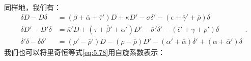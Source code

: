 同样地，我们有：
\begin{equation*}
	\begin{aligned}
		\delta D-D\delta  & =( \beta +\overline{\alpha } +\overline{\tau } ') D+\kappa D'-\sigma \delta '-( \epsilon +\overline{\gamma } '+\overline{\rho }) \delta \\
		\delta D'-D'\delta  & =\overline{\kappa } 'D+( \tau +\overline{\beta } '+\alpha ') D'-\overline{\sigma } '\delta '-(\overline{\epsilon } '+\gamma +\rho ') \delta \\
		\delta '\delta -\delta \delta ' & =( \rho '-\overline{\rho } ') D-(\rho -\overline{\rho } )D'-( \alpha '+\overline{\alpha }) \delta '+( \alpha +\overline{\alpha } ') \delta 
	\end{aligned} .
\end{equation*}
我们也可以将里奇恒等式\ref{eq:5.78}用自旋系数表示：
